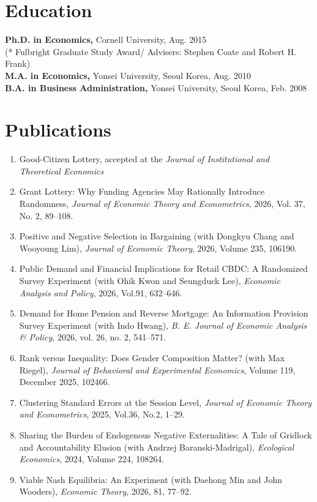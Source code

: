 \documentclass[margin, a4paper]{res}
\begin{document}
\begin{resume}
\section{Education} 
\textbf{Ph.D. in Economics,} Cornell University, Aug. 2015\\
(* Fulbright Graduate Study Award/ Advisers: Stephen Coate and Robert H. Frank)\\
\textbf{M.A. in Economics,} Yonsei University, Seoul Korea,  Aug. 2010\\
\textbf{B.A. in Business Administration,} Yonsei University, Seoul Korea, Feb. 2008

\section{Publications}
\begin{enumerate}[leftmargin=*]
\item Good-Citizen Lottery, accepted at the \emph{Journal of Institutional and Theoretical Economics}
\item Grant Lottery: Why Funding Agencies May Rationally Introduce Randomness, \emph{Journal of Economic Theory and Econometrics}, 2026, Vol. 37, No. 2, 89--108.
\item Positive and Negative Selection in Bargaining (with Dongkyu Chang and Wooyoung Lim), \emph{Journal of Economic Theory}, 2026, Volume 235, 106190.
\item Public Demand and Financial Implications for Retail CBDC: A Randomized Survey Experiment (with Ohik Kwon and Seungduck Lee), \emph{Economic Analysis and Policy}, 2026, Vol.91, 632--646.
\item Demand for Home Pension and Reverse Mortgage: An Information Provision Survey Experiment (with Indo Hwang), \emph{B. E. Journal of Economic Analysis \& Policy}, 2026, vol. 26, no. 2, 541--571.
\item Rank versus Inequality: Does Gender Composition Matter? (with Max Riegel), \emph{Journal of Behavioral and Experimental Economics}, Volume 119, December 2025, 102466.
\item Clustering Standard Errors at the Session Level, \emph{Journal of Economic Theory and Econometrics}, 2025, Vol.36, No.2, 1--29.
\item Sharing the Burden of Endogenous Negative Externalities: A Tale of Gridlock and Accountability Elusion (with Andrzej Baranski-Madrigal), \emph{Ecological Economics}, 2024, Volume 224, 108264.
\item Viable Nash Equilibria: An Experiment (with Daehong Min and John Wooders), \emph{Economic Theory}, 2026, 81, 77--92.

\end{enumerate}
\end{resume}
\end{document}

